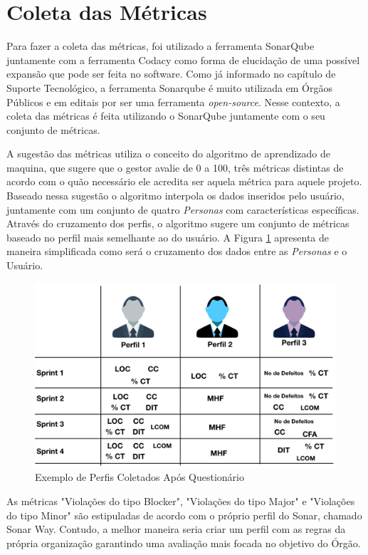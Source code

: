 \section{Coleta das Métricas}

Para fazer a coleta das métricas, foi utilizado a ferramenta SonarQube juntamente com a ferramenta Codacy como forma de elucidação de uma possível expansão que pode ser feita no software. Como já informado no capítulo de Suporte Tecnológico, a ferramenta Sonarqube é muito utilizada em Órgãos Públicos e em editais por ser uma ferramenta \textit{open-source}. Nesse contexto, a coleta das métricas é feita utilizando o SonarQube juntamente com o seu conjunto de métricas.

A sugestão das métricas utiliza o conceito do algoritmo de aprendizado de maquina, que sugere que o gestor avalie de 0 a 100, três métricas distintas de acordo com o quão necessário ele acredita ser aquela métrica para aquele projeto. Baseado nessa sugestão o algoritmo interpola os dados inseridos pelo usuário, juntamente com um conjunto de quatro \textit{Personas} com características específicas. Através do cruzamento dos perfis, o algoritmo sugere um conjunto de métricas baseado no perfil mais semelhante ao do usuário. A Figura \ref{img:perfis} apresenta de maneira simplificada como será o cruzamento dos dados entre as \textit{Personas} e o Usuário.

\graphicspath{{figuras/}}
\begin{figure}[h!]
\centering
\includegraphics[scale=0.70]{perfis_exemplo.png}
\caption{Exemplo de Perfis Coletados Após Questionário}
\label{img:perfis}
\end{figure}

As métricas "Violações do tipo Blocker", "Violações do tipo Major" e "Violações do tipo Minor" são estipuladas de acordo com o próprio perfil do Sonar, chamado Sonar Way. Contudo, a melhor maneira seria criar um perfil com as regras da própria organização garantindo uma avaliação mais focada no objetivo do Órgão.


